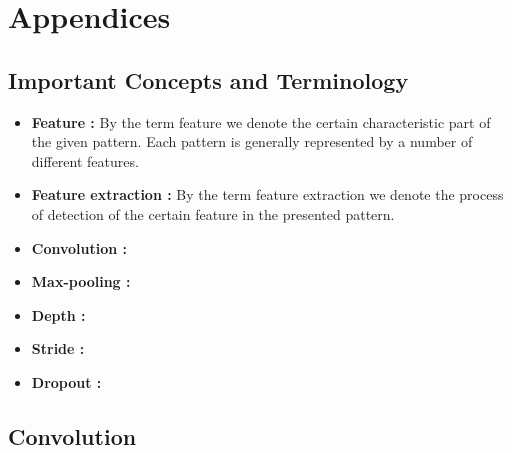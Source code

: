 \documentclass[a4paper,12pt]{report}%
\begin{document}
\newpage

\chapter{\color{IAF} \bf Appendices}
\section{Important Concepts and Terminology} \label{App:Appendix A}
\begin{itemize}
 \item {\bf Feature : } By the term feature we denote the certain characteristic part of the given pattern. Each pattern is generally represented by a number of different features.
 \item {\bf Feature extraction : } By the term feature extraction we denote the process of detection of the certain feature in the presented pattern.
 \item {\bf Convolution :}
 \item {\bf Max-pooling :}
 \item {\bf Depth :}
 \item {\bf Stride :}
 \item {\bf Dropout :}
\end{itemize}



\section{Convolution} \label{App: Appendix B}
\end{document}
